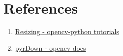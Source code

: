 \documentclass[]{article}
\providecommand{\tightlist}{%
  \setlength{\itemsep}{0pt}\setlength{\parskip}{0pt}}
\begin{document}
\section{References}\label{references}

\begin{enumerate}
\def\labelenumi{\arabic{enumi}.}
\tightlist
\item
  \href{http://opencv-python-tutroals.readthedocs.org/en/latest/py\_tutorials/
  py\_imgproc/py\_pyramids/py\_pyramids.html\#pyramids}{Resizing - opencv-python tutorials}
\item
  \href{http://docs.opencv.org/modules/imgproc/doc/filtering.html\#pyrdown}{pyrDown - opencv docs}
\end{enumerate}
\end{document}
